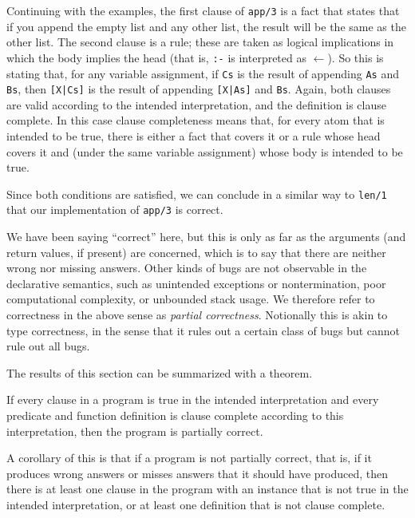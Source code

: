 Continuing with the examples,
the first clause of \texttt{app/3} is a fact that states that
if you append the empty list and any other list,
the result will be the same as the other list.
The second clause is a rule;
these are taken as logical implications
in which the body implies the head
(that is, \texttt{:-} is interpreted as $\leftarrow$).
So this is stating that, for any variable assignment,
if \texttt{Cs} is the result of appending \texttt{As} and \texttt{Bs},
then \texttt{[X|Cs]} is the result of
appending \texttt{[X|As]} and \texttt{Bs}.
Again, both clauses are valid according to the intended interpretation,
and the definition is clause complete.
In this case clause completeness means that,
for every atom that is intended to be true,
there is either a fact that covers it
or a rule whose head covers it and
(under the same variable assignment)
whose body is intended to be true.

Since both conditions are satisfied,
we can conclude in a similar way to \texttt{len/1}
that our implementation of \texttt{app/3} is correct.

We have been saying ``correct'' here,
but this is only as far as the arguments
(and return values, if present)
are concerned,
which is to say that there are neither wrong nor missing answers.
Other kinds of bugs are not observable in the declarative semantics,
such as \mbox{unintended} exceptions or nontermination,
poor computational complexity,
or unbounded stack usage.
We therefore refer to correctness in the above sense
as \emph{partial correctness\label{gi:partial-correctness}}.
Notionally this is akin to type correctness,
in the sense that it rules out a certain class of bugs
but cannot rule out all bugs.

The results of this section can be summarized with a theorem.

\begin{theorem} \label{thm:partial-correctness}
If every clause in a program is true in the intended interpretation
and every predicate and function definition is clause complete
according to this interpretation,
then the program is partially correct.
\end{theorem}

\noindent
A corollary of this is that if a program is not partially correct,
that is, if it produces wrong answers
or misses answers that it should have produced,
then there is at least one clause in the program
with an instance that is not true in the intended interpretation,
or at least one definition that is not clause complete.


